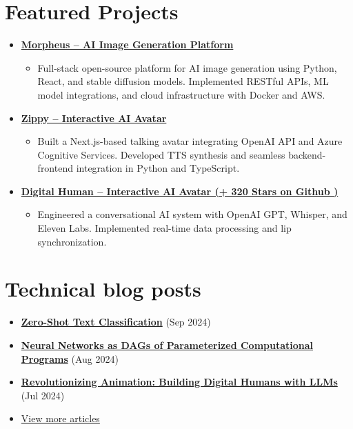 \documentclass[letterpaper,11pt]{article}
\newcommand{\normalfaExternalLink}{{\mdseries\faExternalLink}}
\begin{document}
\section{Featured Projects}
\begin{itemize}[leftmargin=*, itemsep=1pt]
    \item \textbf{\href{https://github.com/Monadical-SAS/Morpheus}{Morpheus -- AI Image Generation Platform \normalfaExternalLink}}
    \begin{itemize}[itemsep=0pt]
        \item Full-stack open-source platform for AI image generation using Python, React, and stable diffusion models. Implemented RESTful APIs, ML model integrations, and cloud infrastructure with Docker and AWS.
    \end{itemize}
    \item \textbf{\href{https://github.com/asanchezyali/ai-avatar}{Zippy -- Interactive AI Avatar \normalfaExternalLink}}
    \begin{itemize}[itemsep=0pt]
        \item Built a Next.js-based talking avatar integrating OpenAI API and Azure Cognitive Services. Developed TTS synthesis and seamless backend-frontend integration in Python and TypeScript.
    \end{itemize}
    \item \textbf{\href{https://github.com/asanchezyali/talking-avatar-with-ai}{Digital Human -- Interactive AI Avatar (+
        320 Stars on Github )\normalfaExternalLink}}
    \begin{itemize}[itemsep=0pt]
        \item Engineered a conversational AI system with OpenAI GPT, Whisper, and Eleven Labs. Implemented real-time data processing and lip synchronization.
    \end{itemize}
\end{itemize}

\section{Technical blog posts}
\begin{itemize}[leftmargin=*, itemsep=0pt]
    \item \textbf{\href{https://www.asanchezyali.com/blog/ai/20240917ZeroShot}{Zero-Shot Text Classification}} (Sep 2024)
    \item \textbf{\href{https://www.asanchezyali.com/blog/differentiable-programming/20240923DifferentiablePrograms}{Neural Networks as DAGs of Parameterized Computational Programs}} (Aug 2024)
    \item \textbf{\href{https://monadical.com/posts/build-a-digital-human-with-large-language-models.html}{Revolutionizing Animation: Building Digital Humans with LLMs}} (Jul 2024)
    \item \href{https://www.asanchezyali.com/}{View more articles \normalfaExternalLink}
\end{itemize}
\end{document}
